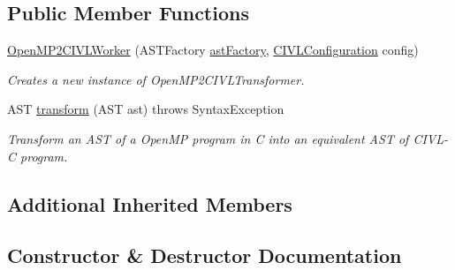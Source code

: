 \subsection*{Public Member Functions}
\begin{DoxyCompactItemize}
\item 
\hyperlink{classedu_1_1udel_1_1cis_1_1vsl_1_1civl_1_1transform_1_1common_1_1OpenMP2CIVLWorker_a43f5b36306e3f73ecf1a4e108b514843}{Open\+M\+P2\+C\+I\+V\+L\+Worker} (A\+S\+T\+Factory \hyperlink{classedu_1_1udel_1_1cis_1_1vsl_1_1civl_1_1transform_1_1common_1_1BaseWorker_a44812bb476e4511fb6ca29a808427186}{ast\+Factory}, \hyperlink{classedu_1_1udel_1_1cis_1_1vsl_1_1civl_1_1config_1_1IF_1_1CIVLConfiguration}{C\+I\+V\+L\+Configuration} config)
\begin{DoxyCompactList}\small\item\em Creates a new instance of Open\+M\+P2\+C\+I\+V\+L\+Transformer. \end{DoxyCompactList}\item 
A\+S\+T \hyperlink{classedu_1_1udel_1_1cis_1_1vsl_1_1civl_1_1transform_1_1common_1_1OpenMP2CIVLWorker_a8771fa670919cd2c91eb020c7a9c493f}{transform} (A\+S\+T ast)  throws Syntax\+Exception 
\begin{DoxyCompactList}\small\item\em Transform an A\+S\+T of a Open\+M\+P program in C into an equivalent A\+S\+T of C\+I\+V\+L-\/\+C program. \end{DoxyCompactList}\end{DoxyCompactItemize}
\subsection*{Additional Inherited Members}


\subsection{Constructor \& Destructor Documentation}
\hypertarget{classedu_1_1udel_1_1cis_1_1vsl_1_1civl_1_1transform_1_1common_1_1OpenMP2CIVLWorker_a43f5b36306e3f73ecf1a4e108b514843}{}
